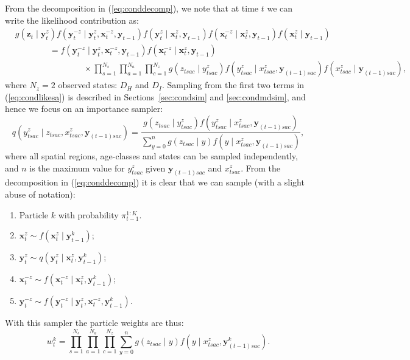 \documentclass[a4paper]{article}
\newcommand{\bx}{\bm{x}}
\newcommand{\by}{\bm{y}}
\newcommand{\bz}{\bm{z}}
\begin{document}
From the decomposition in (\ref{eq:conddecomp}), we note that at time $t$ we can write the likelihood contribution as:
\begin{align}
    &g\left(\bz_{t} \mid \by^z_t\right)f\left(\by^{-z}_{t} \mid \by^z_t, \bx^{-z}_{t}, \by_{t - 1}\right)f\left(\by^z_t \mid \bx^z_t, \by_{t - 1}\right)f\left(\bx^{-z}_t \mid \bx^z_t, \by_{t - 1}\right)f\left(\bx^z_t \mid \by_{t - 1}\right) \nonumber\\
    & \qquad \qquad = f\left(\by^{-z}_{t} \mid \by^z_t, \bx^{-z}_{t}, \by_{t - 1}\right)f\left(\bx^{-z}_{t} \mid \bx^z_{t}, \by_{t - 1}\right)\nonumber\\
    & \qquad \qquad \qquad \qquad \times \prod_{s = 1}^{N_s} \prod_{a = 1}^{N_a} \prod_{c = 1}^{N_z} g\left(z_{tsac} \mid y^z_{tsac}\right)f\left(y^z_{tsac} \mid x^z_{tsac}, \by_{(t - 1)sac}\right)f\left(x^z_{tsac} \mid \by_{(t - 1)sac}\right),\label{eq:condlikesa}
\end{align}
where $N_z = 2$ observed states: $D_H$ and $D_I$. Sampling from the first two terms in (\ref{eq:condlikesa}) is described in Sections~\ref{sec:condsim} and \ref{sec:condmdsim}, and hence we focus on an importance sampler:
\begin{equation}
    q\left(y^z_{tsac} \mid z_{tsac}, x^z_{tsac}, \by_{(t - 1)sac}\right) = \frac{g\left(z_{tsac} \mid y^z_{tsac}\right)f\left(y^z_{tsac} \mid x^z_{tsac}, \by_{(t - 1)sac}\right)}{\sum_{y = 0}^n g\left(z_{tsac} \mid y\right)f\left(y \mid x^z_{tsac}, \by_{(t - 1)sac}\right)},
\end{equation}
where all spatial regions, age-classes and states can be sampled independently, and $n$ is the maximum value for $y^z_{tsac}$ given $\by_{(t - 1)sac}$ and $x^z_{tsac}$. From the decomposition in (\ref{eq:conddecomp}) it is clear that we can sample (with a slight abuse of notation):
\begin{enumerate}
    \item Particle $k$ with probability $\pi^{1:K}_{t - 1}$.
    \item $\bx^z_t \sim f\left(\bx^z_t \mid \by^k_{t - 1}\right)$;
    \item $\by^z_t \sim q\left(\by^z_t \mid \bx^z_t, \by^k_{t - 1}\right)$;
    \item $\bx^{-z}_t \sim f\left(\bx^{-z}_t \mid \bx^z_t, \by^k_{t - 1}\right)$;
    \item $\by^{-z}_t \sim f\left(\by^{-z}_t \mid \by^z_t, \bx^{-z}_t, \by^k_{t - 1}\right)$.
\end{enumerate}
With this sampler the particle weights are thus:
\begin{equation}
    w^k_t = \prod_{s = 1}^{N_s} \prod_{a = 1}^{N_a} \prod_{c = 1}^{N_z} \sum_{y = 0}^n g\left(z_{tsac} \mid y\right)f\left(y \mid x^z_{tsac}, \by^k_{(t - 1)sac}\right).
\end{equation}
\end{document}

